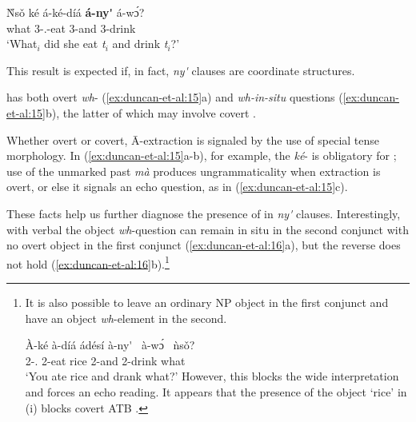 \documentclass[output=paper,modfonts,nonflat,
colorlinks, citecolor=brown,
]{langsci/langscibook}
\begin{document}
\ea\label{ex:duncan-et-al:14}
\gll \`{N}s\v{o} ké á-ké-díá \textbf{á-ny\'{\textturnv}\ng} á-\ng w\'ɔ\ng? \\
what {\FOC} 3{\SG-\PST.\FOC}-eat 3{\SG}-and 3{\SG}-drink \\
\glt `What$_i$ did she eat \textit{t}$_i$ and drink \textit{t}$_i$?'
\z

\noindent This result is expected if, in fact, \textit{ny\'{\textturnv}\ng} clauses are coordinate structures.

 has both overt \textit{wh}- (\ref{ex:duncan-et-al:15}a) and \textit{wh-in-situ} questions (\ref{ex:duncan-et-al:15}b), the latter of which may involve covert .

\ea\label{ex:duncan-et-al:15}
\z
\z

\noindent Whether overt or covert, \={A}-extraction is signaled by the use of special  tense morphology. In (\ref{ex:duncan-et-al:15}a-b), for example, the  \textit{ké}- is obligatory for ; use of the unmarked past  \textit{mà} produces ungrammaticality when extraction is overt, or else it signals an echo question, as in (\ref{ex:duncan-et-al:15}c).

These facts help us further diagnose the presence of  in \textit{ny\'{\textturnv}\ng} clauses. Interestingly, with verbal  the object \textit{wh}-question can remain {in situ} in the second conjunct with no overt object in the first conjunct (\ref{ex:duncan-et-al:16}a), but the reverse does not hold (\ref{ex:duncan-et-al:16}b).\footnote{It is also possible to leave an ordinary NP object in the first conjunct and have an object \textit{wh}-element in the second.

\ea\label{ex:duncan-et-al:i}
\gll \`{A}-ké à-díá ádésí à-ny\'{\textturnv}\ng~ à-\ng w\'ɔ\ng~ ǹs\v{o}? \\
2{\SG-\PST.\FOC} 2{\SG}-eat rice 2{\SG}-and 2{\SG}-drink what \\
\glt `You ate rice and drank what?'
\z
However, this blocks the wide  interpretation and forces an echo reading. It appears that the presence of the object `rice' in (i) blocks covert ATB .}
\end{document}
